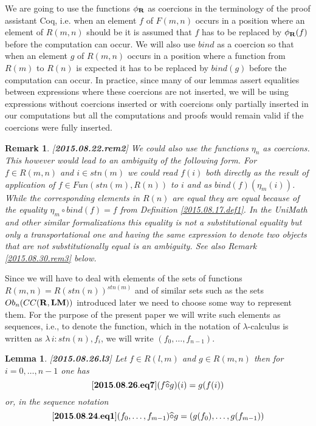 \documentclass[11pt]{article}
\newenvironment{eq}{\begin{equation}}{\end{equation}}
\newtheorem{lemma}[proposition]{Lemma}
\newtheorem{remark}[proposition]{Remark}
\newcommand{\llabel}[1]{\label{#1}[{\bf #1}]}
\newcommand{\rr}{{\bf R}}
\newcommand{\lm}{{\bf LM}}
\newcommand{\wh}{\widehat}
\newcommand{\bind}{bind}
\newcommand{\hc}{\wh{\circ}}
\begin{document}
We are going to use the functions $\phi_{\rr}$ as coercions in the terminology of the proof assistant Coq, i.e. when an element $f$ of $F(m,n)$ occurs in a position where an element of $R(m,n)$ should be it is assumed that $f$ has to be replaced by $\phi_{\rr}(f)$ before the computation can occur. We will also use $\bind$ as a coercion so that when an element $g$ of $R(m,n)$ occurs in a position where a function from $R(m)$ to $R(n)$ is expected it has to be replaced by $\bind(g)$ before the computation can occur. In practice, since many of our lemmas assert equalities between expressions where these coercions are not inserted, we will be using expressions without coercions inserted or with coercions only partially inserted in our computations but all the computations and proofs would remain valid if the coercions were fully inserted. 
%
%
\begin{remark}
\rm\llabel{2015.08.22.rem2}
We could also use the functions $\eta_n$ as coercions. This however would lead to an ambiguity of the following form. For $f\in R(m,n)$ and $i\in stn(m)$ we could read $f(i)$ both directly as the result of application of $f\in Fun(stn(m),R(n))$ to $i$ and as $\bind(f)(\eta_m(i))$. While the corresponding elements in $R(n)$ are equal they are equal because of the equality $\eta_m\circ \bind(f)=f$ from Definition \ref{2015.08.17.def1}. In the UniMath and other similar formalizations this equality is not a substitutional equality but only a transportational one and having the same expression to denote two objects that are not substitutionally equal is an ambiguity. See also Remark \ref{2015.08.30.rem3} below. 
\end{remark}
%
Since we will have to deal with elements of the sets of functions $R(m,n)=R(stn(n))^{stn(m)}$ and of similar sets such as the sets $Ob_n(CC(\rr,\lm))$ introduced later we need to choose some way to represent them. For the purpose of the present paper we will write such elements as sequences, i.e., to denote the function, which in the notation of $\lambda$-calculus is written as $\lambda\,i:stn(n), f_i$, we will write $(f_0,\dots,f_{n-1})$.
%
\begin{lemma}
\llabel{2015.08.26.l3}
Let $f\in R(l,m)$ and $g\in R(m,n)$ then for $i=0,\dots,n-1$ one has
%
\begin{eq}\llabel{2015.08.26.eq7}
(f\hc g)(i)=g(f(i))
\end{eq}
%
or, in the sequence notation
%
\begin{eq}\llabel{2015.08.24.eq1}
(f_0,\dots,f_{m-1})\hc g=(g(f_0),\dots,g(f_{m-1}))
\end{eq}
%
\end{lemma}
\end{document}
